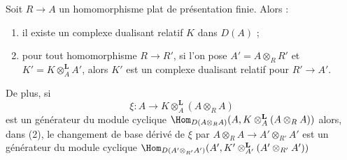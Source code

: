\begin{lemma}
\label{lemma-base-change-relative-dualizing}
Soit $R \to A$ un homomorphisme plat de présentation finie. Alors :
\begin{enumerate}
\item il existe un complexe dualisant relatif $K$ dans $D(A)$ ;
\item pour tout homomorphisme $R \to R'$, si l'on pose $A' = A \otimes_R R'$
et $K' = K \otimes_A^\mathbf{L} A'$, alors $K'$ est un complexe dualisant relatif pour $R' \to A'$.
\end{enumerate}
De plus, si
$$
\xi : A \longrightarrow K \otimes_A^\mathbf{L} (A \otimes_R A)
$$
est un générateur du module cyclique
$\Hom_{D(A \otimes_R A)}(A, K \otimes_A^\mathbf{L} (A \otimes_R A))$
alors, dans (2), le changement de base dérivé de $\xi$ par
$A \otimes_R A \to A' \otimes_{R'} A'$ est un générateur du module cyclique
$\Hom_{D(A' \otimes_{R'} A')}(A',
K' \otimes_{A'}^\mathbf{L} (A' \otimes_{R'} A'))$
\end{lemma}

